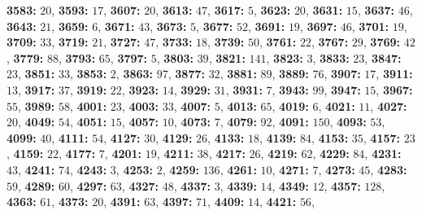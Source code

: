 \textsf{\bfseries 3583:} $20$, \textsf{\bfseries 3593:} $17$, \textsf{\bfseries 3607:} $20$, \textsf{\bfseries 3613:} $47$, \textsf{\bfseries 3617:} $5$, \textsf{\bfseries 3623:} $20$, \textsf{\bfseries 3631:} $15$, \textsf{\bfseries 3637:} $46$, \textsf{\bfseries 3643:} $21$, \textsf{\bfseries 3659:} $6$, \textsf{\bfseries 3671:} $43$, \textsf{\bfseries 3673:} $5$, \textsf{\bfseries 3677:} $52$, \textsf{\bfseries 3691:} $19$, \textsf{\bfseries 3697:} $46$, \textsf{\bfseries 3701:} $19$, \textsf{\bfseries 3709:} $33$, \textsf{\bfseries 3719:} $21$, \textsf{\bfseries 3727:} $47$, \textsf{\bfseries 3733:} $18$, \textsf{\bfseries 3739:} $50$, \textsf{\bfseries 3761:} $22$, \textsf{\bfseries 3767:} $29$, \textsf{\bfseries 3769:} $42$, \textsf{\bfseries 3779:} $88$, \textsf{\bfseries 3793:} $65$, \textsf{\bfseries 3797:} $5$, \textsf{\bfseries 3803:} $39$, \textsf{\bfseries 3821:} $141$, \textsf{\bfseries 3823:} $3$, \textsf{\bfseries 3833:} $23$, \textsf{\bfseries 3847:} $23$, \textsf{\bfseries 3851:} $33$, \textsf{\bfseries 3853:} $2$, \textsf{\bfseries 3863:} $97$, \textsf{\bfseries 3877:} $32$, \textsf{\bfseries 3881:} $89$, \textsf{\bfseries 3889:} $76$, \textsf{\bfseries 3907:} $17$, \textsf{\bfseries 3911:} $13$, \textsf{\bfseries 3917:} $37$, \textsf{\bfseries 3919:} $22$, \textsf{\bfseries 3923:} $14$, \textsf{\bfseries 3929:} $31$, \textsf{\bfseries 3931:} $7$, \textsf{\bfseries 3943:} $99$, \textsf{\bfseries 3947:} $15$, \textsf{\bfseries 3967:} $55$, \textsf{\bfseries 3989:} $58$, \textsf{\bfseries 4001:} $23$, \textsf{\bfseries 4003:} $33$, \textsf{\bfseries 4007:} $5$, \textsf{\bfseries 4013:} $65$, \textsf{\bfseries 4019:} $6$, \textsf{\bfseries 4021:} $11$, \textsf{\bfseries 4027:} $20$, \textsf{\bfseries 4049:} $54$, \textsf{\bfseries 4051:} $15$, \textsf{\bfseries 4057:} $10$, \textsf{\bfseries 4073:} $7$, \textsf{\bfseries 4079:} $92$, \textsf{\bfseries 4091:} $150$, \textsf{\bfseries 4093:} $53$, \textsf{\bfseries 4099:} $40$, \textsf{\bfseries 4111:} $54$, \textsf{\bfseries 4127:} $30$, \textsf{\bfseries 4129:} $26$, \textsf{\bfseries 4133:} $18$, \textsf{\bfseries 4139:} $84$, \textsf{\bfseries 4153:} $35$, \textsf{\bfseries 4157:} $23$, \textsf{\bfseries 4159:} $22$, \textsf{\bfseries 4177:} $7$, \textsf{\bfseries 4201:} $19$, \textsf{\bfseries 4211:} $38$, \textsf{\bfseries 4217:} $26$, \textsf{\bfseries 4219:} $62$, \textsf{\bfseries 4229:} $84$, \textsf{\bfseries 4231:} $43$, \textsf{\bfseries 4241:} $74$, \textsf{\bfseries 4243:} $3$, \textsf{\bfseries 4253:} $2$, \textsf{\bfseries 4259:} $136$, \textsf{\bfseries 4261:} $10$, \textsf{\bfseries 4271:} $7$, \textsf{\bfseries 4273:} $45$, \textsf{\bfseries 4283:} $59$, \textsf{\bfseries 4289:} $60$, \textsf{\bfseries 4297:} $63$, \textsf{\bfseries 4327:} $48$, \textsf{\bfseries 4337:} $3$, \textsf{\bfseries 4339:} $14$, \textsf{\bfseries 4349:} $12$, \textsf{\bfseries 4357:} $128$, \textsf{\bfseries 4363:} $61$, \textsf{\bfseries 4373:} $20$, \textsf{\bfseries 4391:} $63$, \textsf{\bfseries 4397:} $71$, \textsf{\bfseries 4409:} $14$, \textsf{\bfseries 4421:} $56$, 
